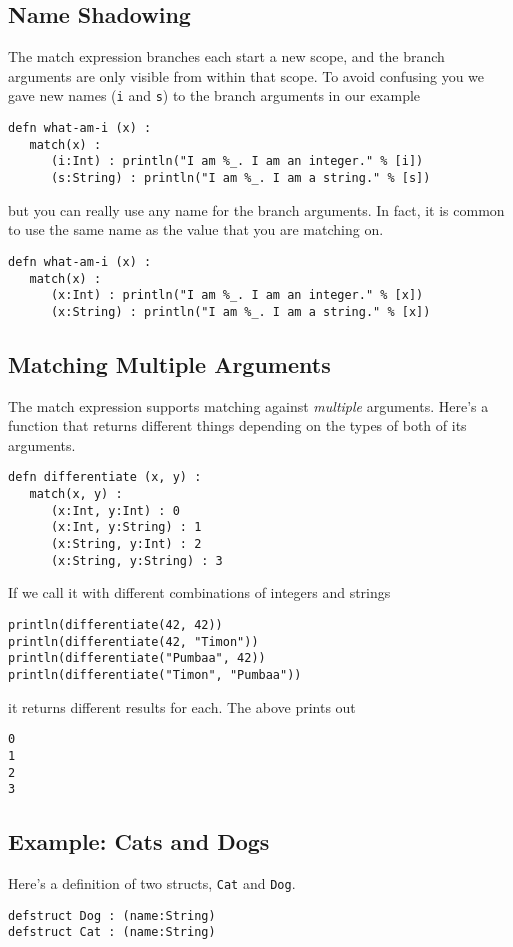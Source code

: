 \documentclass[10pt,oneside]{book}
\begin{document}
\subsection*{Name Shadowing}
The match expression branches each start a new scope, and the branch arguments are only visible from within that scope. To avoid confusing you we gave new names (\texttt{\frenchspacing i} and \texttt{\frenchspacing s}) to the branch arguments in our example
\begin{lstlisting}
defn what-am-i (x) :
   match(x) :
      (i:Int) : println("I am %_. I am an integer." % [i])
      (s:String) : println("I am %_. I am a string." % [s])
\end{lstlisting}
but you can really use any name for the branch arguments. In fact, it is common to use the same name as the value that you are matching on.
\begin{lstlisting}
defn what-am-i (x) :
   match(x) :
      (x:Int) : println("I am %_. I am an integer." % [x])
      (x:String) : println("I am %_. I am a string." % [x])
\end{lstlisting}

\subsection*{Matching Multiple Arguments}
The match expression supports matching against {\em multiple} arguments. Here's a function that returns different things depending on the types of both of its arguments.
\begin{lstlisting}
defn differentiate (x, y) :
   match(x, y) :
      (x:Int, y:Int) : 0
      (x:Int, y:String) : 1
      (x:String, y:Int) : 2
      (x:String, y:String) : 3
\end{lstlisting}
If we call it with different combinations of integers and strings
\begin{lstlisting}
println(differentiate(42, 42))
println(differentiate(42, "Timon"))
println(differentiate("Pumbaa", 42))
println(differentiate("Timon", "Pumbaa"))
\end{lstlisting}
it returns different results for each. The above prints out
\begin{lstlisting}
0
1
2
3
\end{lstlisting}

\subsection*{Example: Cats and Dogs}
Here's a definition of two structs, \texttt{\frenchspacing Cat} and \texttt{\frenchspacing Dog}. 
\begin{lstlisting}
defstruct Dog : (name:String)
defstruct Cat : (name:String)
\end{lstlisting}
\end{document}
